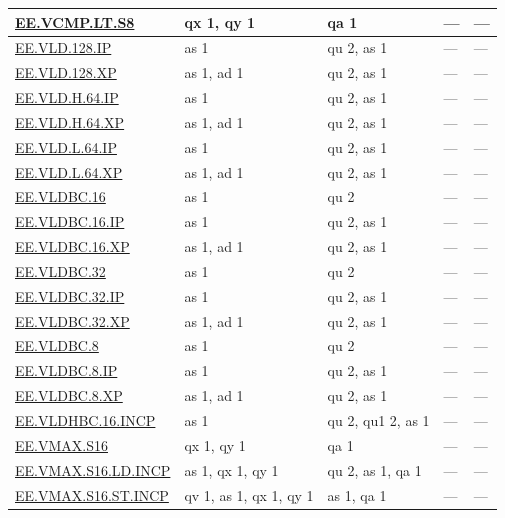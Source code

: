 \begin{longtable}[c]{|l|m{2.5cm}|m{2.5cm}|m{2.5cm}|m{2.5cm}|}
    \hyperref[instruction:EEVCMPLTS8]{EE.VCMP.LT.S8} & qx 1, qy 1 & qa 1 & — & — \\\hline
    \hyperref[instruction:EEVLD128IP]{EE.VLD.128.IP} & as 1 & qu 2, as 1 & — & — \\\hline
    \hyperref[instruction:EEVLD128XP]{EE.VLD.128.XP} & as 1, ad 1 & qu 2, as 1 & — & — \\\hline
    \hyperref[instruction:EEVLDH64IP]{EE.VLD.H.64.IP} & as 1 & qu 2, as 1 & — & — \\\hline
    \hyperref[instruction:EEVLDH64XP]{EE.VLD.H.64.XP} & as 1, ad 1 & qu 2, as 1 & — & — \\\hline
    \hyperref[instruction:EEVLDL64IP]{EE.VLD.L.64.IP} & as 1 & qu 2, as 1 & — & — \\\hline
    \hyperref[instruction:EEVLDL64XP]{EE.VLD.L.64.XP} & as 1, ad 1 & qu 2, as 1 & — & — \\\hline
    \hyperref[instruction:EEVLDBC16]{EE.VLDBC.16} & as 1 & qu 2 & — & — \\\hline
    \hyperref[instruction:EEVLDBC16IP]{EE.VLDBC.16.IP} & as 1 & qu 2, as 1 & — & — \\\hline
    \hyperref[instruction:EEVLDBC16XP]{EE.VLDBC.16.XP} & as 1, ad 1 & qu 2, as 1 & — & — \\\hline
    \hyperref[instruction:EEVLDBC32]{EE.VLDBC.32} & as 1 & qu 2 & — & — \\\hline
    \hyperref[instruction:EEVLDBC32IP]{EE.VLDBC.32.IP} & as 1 & qu 2, as 1 & — & — \\\hline
    \hyperref[instruction:EEVLDBC32XP]{EE.VLDBC.32.XP} & as 1, ad 1 & qu 2, as 1 & — & — \\\hline
    \hyperref[instruction:EEVLDBC8]{EE.VLDBC.8} & as 1 & qu 2 & — & — \\\hline
    \hyperref[instruction:EEVLDBC8IP]{EE.VLDBC.8.IP} & as 1 & qu 2, as 1 & — & — \\\hline
    \hyperref[instruction:EEVLDBC8XP]{EE.VLDBC.8.XP} & as 1, ad 1 & qu 2, as 1 & — & — \\\hline
    \hyperref[instruction:EEVLDHBC16INCP]{EE.VLDHBC.16.INCP} & as 1 & qu 2, qu1 2, as 1 & — & — \\\hline
    \hyperref[instruction:EEVMAXS16]{EE.VMAX.S16} & qx 1, qy 1 & qa 1 & — & — \\\hline
    \hyperref[instruction:EEVMAXS16LDINCP]{EE.VMAX.S16.LD.INCP} & as 1, qx 1, qy 1 & qu 2, as 1, qa 1 & — & — \\\hline
    \hyperref[instruction:EEVMAXS16STINCP]{EE.VMAX.S16.ST.INCP} & qv 1, as 1, qx 1, qy 1 & as 1, qa 1 & — & — \\\hline

\end{longtable}
